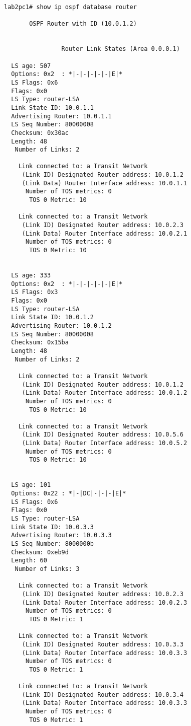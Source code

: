 \begin{lstlisting}
lab2pc1# show ip ospf database router

       OSPF Router with ID (10.0.1.2)


                Router Link States (Area 0.0.0.1)

  LS age: 507
  Options: 0x2  : *|-|-|-|-|-|E|*
  LS Flags: 0x6  
  Flags: 0x0
  LS Type: router-LSA
  Link State ID: 10.0.1.1 
  Advertising Router: 10.0.1.1
  LS Seq Number: 80000008
  Checksum: 0x30ac
  Length: 48
   Number of Links: 2

    Link connected to: a Transit Network
     (Link ID) Designated Router address: 10.0.1.2
     (Link Data) Router Interface address: 10.0.1.1
      Number of TOS metrics: 0
       TOS 0 Metric: 10

    Link connected to: a Transit Network
     (Link ID) Designated Router address: 10.0.2.3
     (Link Data) Router Interface address: 10.0.2.1
      Number of TOS metrics: 0
       TOS 0 Metric: 10


  LS age: 333
  Options: 0x2  : *|-|-|-|-|-|E|*
  LS Flags: 0x3  
  Flags: 0x0
  LS Type: router-LSA
  Link State ID: 10.0.1.2 
  Advertising Router: 10.0.1.2
  LS Seq Number: 80000008
  Checksum: 0x15ba
  Length: 48
   Number of Links: 2

    Link connected to: a Transit Network
     (Link ID) Designated Router address: 10.0.1.2
     (Link Data) Router Interface address: 10.0.1.2
      Number of TOS metrics: 0
       TOS 0 Metric: 10

    Link connected to: a Transit Network
     (Link ID) Designated Router address: 10.0.5.6
     (Link Data) Router Interface address: 10.0.5.2
      Number of TOS metrics: 0
       TOS 0 Metric: 10


  LS age: 101
  Options: 0x22 : *|-|DC|-|-|-|E|*
  LS Flags: 0x6  
  Flags: 0x0
  LS Type: router-LSA
  Link State ID: 10.0.3.3 
  Advertising Router: 10.0.3.3
  LS Seq Number: 8000000b
  Checksum: 0xeb9d
  Length: 60
   Number of Links: 3

    Link connected to: a Transit Network
     (Link ID) Designated Router address: 10.0.2.3
     (Link Data) Router Interface address: 10.0.2.3
      Number of TOS metrics: 0
       TOS 0 Metric: 1

    Link connected to: a Transit Network
     (Link ID) Designated Router address: 10.0.3.3
     (Link Data) Router Interface address: 10.0.3.3
      Number of TOS metrics: 0
       TOS 0 Metric: 1

    Link connected to: a Transit Network
     (Link ID) Designated Router address: 10.0.3.4
     (Link Data) Router Interface address: 10.0.3.3
      Number of TOS metrics: 0
       TOS 0 Metric: 1



\end{lstlisting}
